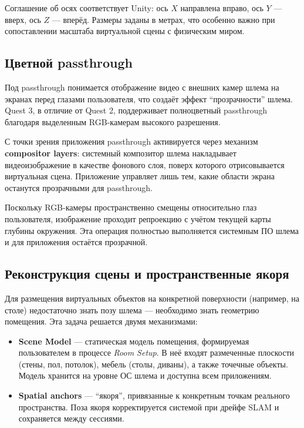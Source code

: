 \documentclass[a4paper,12pt]{article}
\begin{document}
Соглашение об осях соответствует Unity: ось $X$ направлена вправо, ось $Y$ --- вверх, ось $Z$ --- вперёд. Размеры заданы в метрах, что особенно важно при сопоставлении масштаба виртуальной сцены с физическим миром.

\subsection*{Цветной passthrough}

Под passthrough понимается отображение видео с внешних камер шлема на экранах перед глазами пользователя, что создаёт эффект ``прозрачности'' шлема. Quest 3, в отличие от Quest 2, поддерживает полноцветный passthrough благодаря выделенным RGB-камерам высокого разрешения.

С точки зрения приложения passthrough активируется через механизм \textbf{compositor layers}: системный композитор шлема накладывает видеоизображение в качестве фонового слоя, поверх которого отрисовывается виртуальная сцена. Приложение управляет лишь тем, какие области экрана останутся прозрачными для passthrough.

Поскольку RGB-камеры пространственно смещены относительно глаз пользователя, изображение проходит репроекцию с учётом текущей карты глубины окружения. Эта операция полностью выполняется системным ПО шлема и для приложения остаётся прозрачной.

\subsection*{Реконструкция сцены и пространственные якоря}

Для размещения виртуальных объектов на конкретной поверхности (например, на столе) недостаточно знать позу шлема --- необходимо знать геометрию помещения. Эта задача решается двумя механизмами:

\begin{itemize}
    \item \textbf{Scene Model} --- статическая модель помещения, формируемая пользователем в процессе \textit{Room Setup}. В неё входят размеченные плоскости (стены, пол, потолок), мебель (столы, диваны), а также точечные объекты. Модель хранится на уровне ОС шлема и доступна всем приложениям.
    \item \textbf{Spatial anchors} --- ``якоря'', привязанные к конкретным точкам реального пространства. Поза якоря корректируется системой при дрейфе SLAM и сохраняется между сессиями.
\end{itemize}
\end{document}
